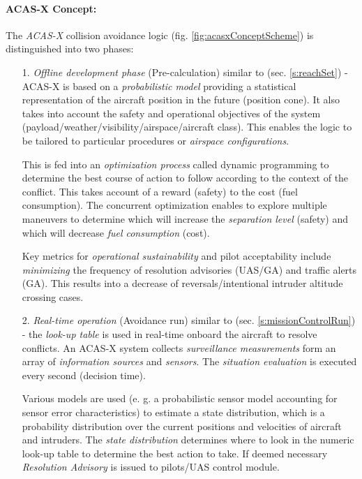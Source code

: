 \paragraph{ACAS-X Concept:} The \emph{ACAS-X} collision avoidance logic (fig. \ref{fig:acasxConceptScheme}) is distinguished into two phases:
\begin{itemize}
    \item[1.] \emph{Offline development phase} (Pre-calculation) similar to (sec. \ref{s:reachSet}) - ACAS-X is based on a \emph{probabilistic model} providing a statistical representation of the aircraft position in the future (position cone). It also takes into account the safety and operational objectives of the system (payload/weather/visibility/airspace/aircraft class). This enables the logic to be tailored to particular procedures or \emph{airspace configurations}.
    
    This is fed into an \emph{optimization process} called dynamic programming to determine the best course of action to follow according to the context of the conflict. This takes account of a reward (safety) to the cost (fuel consumption). The concurrent optimization enables to explore multiple maneuvers to determine which will increase the \emph{separation level} (safety) and which will decrease \emph{fuel consumption} (cost).
    
    Key metrics for \emph{operational sustainability} and pilot acceptability include \emph{minimizing} the frequency of resolution advisories (UAS/GA) and traffic alerts (GA). This results into a decrease of reversals/intentional intruder altitude crossing cases.
    
    \item[2.] \emph{Real-time operation} (Avoidance run) similar to (sec. \ref{s:missionControlRun}) - the \emph{look-up table} is used in real-time onboard the aircraft to resolve conflicts. An ACAS-X system collects \emph{surveillance measurements} form an array of \emph{information sources} and \emph{sensors}. The \emph{situation evaluation} is executed every second (decision time).
    
    Various models are used (e. g. a probabilistic sensor model accounting for sensor error characteristics) to estimate a state distribution, which is a probability distribution over the current positions and velocities of aircraft and intruders. The \emph{state distribution} determines where to look in the numeric look-up table to determine the best action to take. If deemed necessary \emph{Resolution Advisory} is issued to pilots/UAS control module.
    
\end{itemize}

